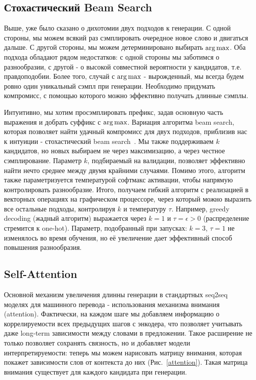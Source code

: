 \documentclass{spbau-diploma}
\begin{document}
\subsection{Стохастический Beam Search}
Выше, уже было сказано о дихотомии двух подходов к генерации. С одной стороны,
мы можем всякий раз сэмплировать очередное новое слово и двигаться дальше. С
другой стороны, мы можем детерминировано выбирать $\operatorname*{arg\,max}$. Оба подхода 
обладают рядом недостатков: с одной стороны мы заботимся о разнообразии, с 
другой - о высокой совместной вероятности у кандидатов, т.е. правдоподобии.
Более того, случай с $\operatorname*{arg\,max}$ - вырожденный, мы всегда будем ровно один
уникальный сэмпл при генерации. Необходимо придумать компромисс, с помощью 
которого можно эффективно получать длинные сэмплы.

Интуитивно, мы хотим просэмплировать префикс, задав основную часть выражения и 
добрать суффикс с $\operatorname*{arg\,max}$. Вариация алгоритма beam search, которая позволяет
найти удачный компромисс для двух подходов, приблизив нас к интуиции - 
стохастический beam search~\cite{sbeamsearch}. Мы также поддерживаем $k$ 
кандидатов, но новых выбираем не через максимизацию, а через честное 
сэмплирование. Параметр $k$, подбираемый на валидации, позволяет эффективно 
найти нечто среднее между двумя крайними случаями. Помимо этого, алгоритм 
также параметризуется температурой софтмакс активации, чтобы напрямую 
контролировать разнообразие. Итого, получаем гибкий алгоритм с реализацией в 
векторных операциях на графическом процессоре, через который можно выразить 
все остальные подходы, контролируя $k$ и температуру $\tau$. Например, greedy 
decoding (жадный алгоритм) выражается через $k=1$ и $\tau=\epsilon > 0$ 
(распределение стремится к one-hot). 
Параметр, подобранный при запусках: $k=3$, $\tau=1$ не изменялось 
во время обучения, но её увеличение дает эффективный способ повышения 
разнообразия.

\subsection{Self-Attention}
Основной механизм увеличения длинны генерации в стандартных seq2seq моделях
для машинного перевода - использования механизма внимания (attention). 
Фактически, на каждом шаге мы добавляем информацию о коррелируемости всех 
предыдущих шагов с энкодера, что позволяет учитывать даже long-term 
зависимости между словами в предложении. Такое расширение не только позволяет
сохранять связность, но и добавляет модели интерпретируемости: теперь мы можем
нарисовать матрицу внимания, которая покажет зависимости слов от контекста до 
них (Рис.~\ref{attention}). Такая матрица внимания существует для каждого 
кандидата при генерации.
\end{document}
